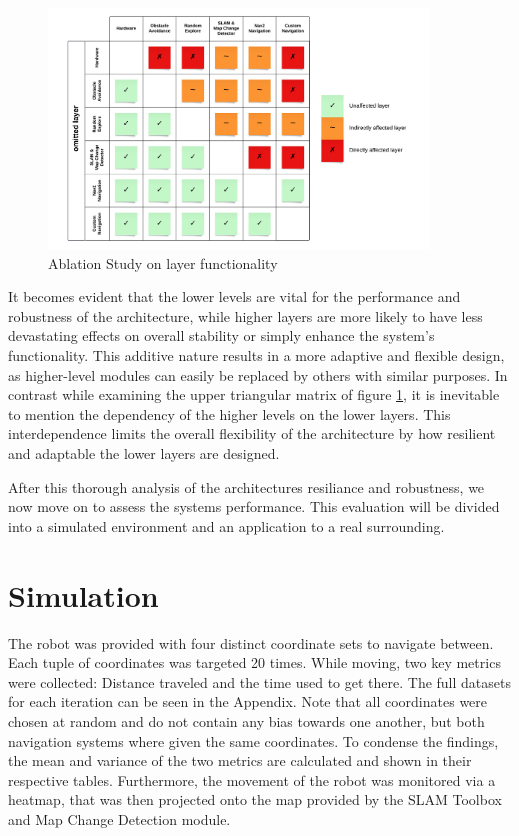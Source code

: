 \documentclass[%
paper=A4,               %
twoside=true,           %
openright,              %
11pt,                   %
bibliography=totoc,     %
titlepage=on,           %
DIV=12,                 %
BCOR=1.5cm,             %
parskip=half,            %
final
]{scrreprt}
\begin{document}
	
	\newpage
	
	\begin{figure}[H]
		\centering
		\includegraphics[width=0.9\textwidth]{Graphics/AblationStudy}
		\caption{Ablation Study on layer functionality}
		\label{fig: fig9}
	\end{figure}
	
	It becomes evident that the lower levels are vital for the performance and robustness of the architecture, while higher layers are more likely to have less devastating effects on overall stability or simply enhance the system's functionality. This additive nature results in a more adaptive and flexible design, as higher-level modules can easily be replaced by others with similar purposes. In contrast while examining the upper triangular matrix of figure \ref{fig: fig9}, it is inevitable to mention the dependency of the higher levels on the lower layers. This interdependence limits the overall flexibility of the architecture by how resilient and adaptable the lower layers are designed. 
	
	After this thorough analysis of the architectures resiliance and robustness, we now move on to assess the systems performance. This evaluation will be divided into a simulated environment and an application to a real surrounding. 
	\section{Simulation} 
	The robot was provided with four distinct coordinate sets to navigate between. Each tuple of coordinates was targeted 20 times. While moving, two key metrics were collected: Distance traveled and the time used to get there. The full datasets for each iteration can be seen in the Appendix. Note that all coordinates were chosen at random and do not contain any bias towards one another, but both navigation systems where given the same coordinates. 
	To condense the findings, the mean and variance of the two metrics are calculated and shown in their respective tables. Furthermore, the movement of the robot was monitored via a heatmap, that was then projected onto the map provided by the SLAM Toolbox and Map Change Detection module.
	
\end{document}
